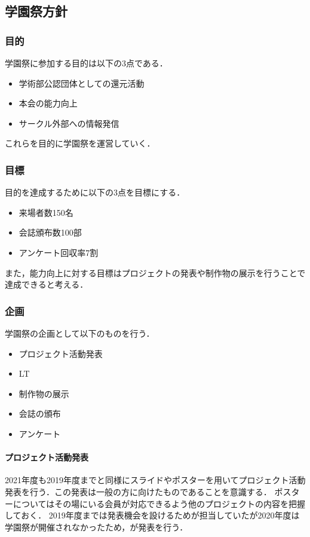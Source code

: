\subsection*{学園祭方針}


\subsubsection*{目的}
学園祭に参加する目的は以下の3点である．
\begin{itemize}
    \item 学術部公認団体としての還元活動
    \item 本会の能力向上
    \item サークル外部への情報発信
\end{itemize}
これらを目的に学園祭を運営していく．
\subsubsection*{目標}
目的を達成するために以下の3点を目標にする．
\begin{itemize}
    \item 来場者数150名
    \item 会誌頒布数100部
    \item アンケート回収率7割
\end{itemize}
また，能力向上に対する目標はプロジェクトの発表や制作物の展示を行うことで達成できると考える．
\subsubsection*{企画}
学園祭の企画として以下のものを行う．
\begin{itemize}
    \item プロジェクト活動発表
    \item LT
    \item 制作物の展示
    \item 会誌の頒布
    \item アンケート
\end{itemize}
\paragraph{プロジェクト活動発表}
2021年度も2019年度までと同様にスライドやポスターを用いてプロジェクト活動発表を行う．この発表は一般の方に向けたものであることを意識する．
ポスターについてはその場にいる会員が対応できるよう他のプロジェクトの内容を把握しておく．
2019年度までは発表機会を設けるため\firstGrade{}が担当していたが2020年度は学園祭が開催されなかったため\firstGrade{}，\secondGrade{}が発表を行う．
